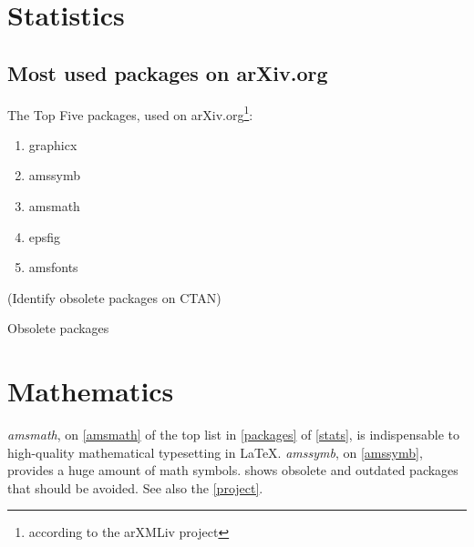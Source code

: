 \documentclass{book}
\begin{document}
\chapter{Statistics}\label{stats}
\section{Most used packages on arXiv.org}\label{packages}
The Top Five packages, used on arXiv.org\footnote{according
to the arXMLiv project\label{project}}:
\begin{enumerate}
  \item graphicx
  \item amssymb \label{amssymb}
  \item amsmath \label{amsmath}
  \item epsfig
  \item amsfonts
\end{enumerate}
\begin{table}[tp]
  \centering
  (Identify obsolete packages on CTAN)
  \caption{Obsolete packages}\label{obsolete}
\end{table}
\chapter{Mathematics}
\emph{amsmath}, on \vref{amsmath} of the top list in \vref{packages} of \vref{stats},
is indispensable to high-quality mathematical typesetting in \LaTeX.
\emph{amssymb}, on \vref{amssymb}, provides a huge amount of math symbols.
 shows obsolete and outdated packages that should be avoided.
See also the \vref{project}.
\end{document}
